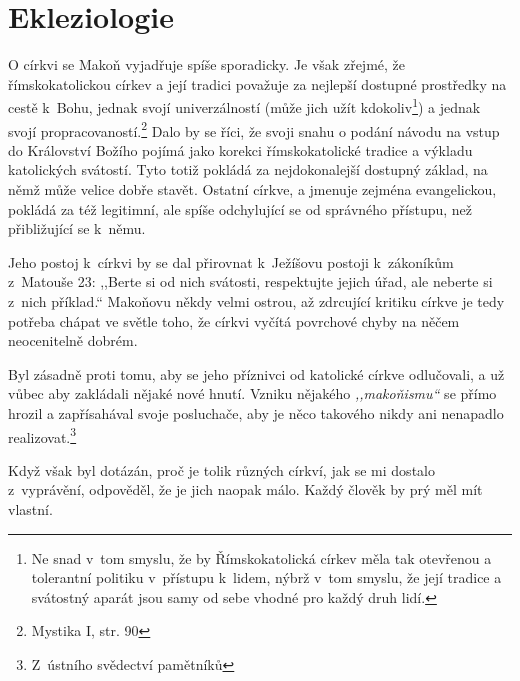 \section{Ekleziologie}

O církvi se Makoň vyjadřuje spíše sporadicky. Je však zřejmé, že římskokatolickou
církev a její tradici považuje za nejlepší dostupné prostředky na cestě k~Bohu,
jednak svojí univerzálností (může jich užít kdokoliv\footnote{Ne snad v~tom
smyslu, že by Římskokatolická církev měla tak otevřenou a tolerantní politiku
v~přístupu k~lidem, nýbrž v~tom smyslu, že její tradice a svátostný aparát
jsou samy od sebe vhodné pro každý druh lidí.}) a jednak svojí
propracovaností.\footnote{Mystika I, str. 90} Dalo by se říci, že svoji snahu o podání návodu na vstup do
Království Božího pojímá jako korekci římskokatolické tradice a výkladu
katolických svátostí. Tyto totiž pokládá za nejdokonalejší dostupný základ, na
němž může velice dobře stavět. Ostatní církve, a jmenuje zejména evangelickou,
pokládá za též legitimní, ale spíše odchylující se od správného přístupu, než
přibližující se k~němu.

Jeho postoj k~církvi by se dal přirovnat k~Ježíšovu postoji k~zákoníkům
z~Matouše 23: ,,Berte
si od nich svátosti, respektujte jejich úřad, ale neberte si z~nich příklad.``
Makoňovu někdy velmi ostrou, až zdrcující kritiku církve je tedy potřeba chápat
ve světle toho, že církvi vyčítá povrchové chyby na něčem neocenitelně dobrém.

Byl zásadně proti tomu, aby se jeho příznivci od katolické církve odlučovali, a
už vůbec aby zakládali nějaké nové hnutí. Vzniku nějakého \textit{,,makoňismu``}
se přímo hrozil a zapřísahával svoje posluchače, aby je něco takového nikdy ani
nenapadlo realizovat.\footnote{Z~ústního svědectví pamětníků}

Když však byl dotázán, proč je tolik různých církví, jak se mi dostalo
z~vyprávění, odpověděl, že je jich naopak málo. Každý člověk by prý měl mít
vlastní.

